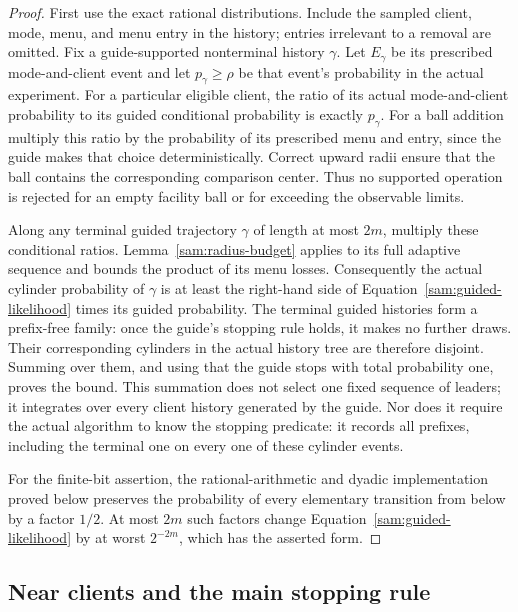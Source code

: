 \begin{proof}
First use the exact rational distributions.  Include the sampled client,
mode, menu, and menu entry in the history; entries irrelevant to a removal
are omitted.  Fix a guide-supported nonterminal history $\gamma$.
Let $E_\gamma$ be its prescribed mode-and-client event and let
$p_\gamma\ge\rho$ be that event's probability in the actual experiment.
For a particular eligible client, the ratio of its actual mode-and-client
probability to its guided conditional probability is exactly $p_\gamma$.
For a ball addition multiply this ratio by the probability of its
prescribed menu and entry, since the guide makes that choice deterministically.
Correct upward radii ensure that the ball contains the corresponding
comparison center.  Thus no supported operation is rejected for an empty
facility ball or for exceeding the observable limits.

Along any terminal guided trajectory $\gamma$ of length at most $2m$,
multiply these conditional ratios.  Lemma~\ref{sam:radius-budget} applies
to its full adaptive sequence and bounds the product of its menu losses.
Consequently the actual cylinder probability of $\gamma$ is at least the
right-hand side of Equation~\eqref{sam:guided-likelihood} times its guided
probability.  The terminal guided histories form a prefix-free family:
once the guide's stopping rule holds, it makes no further draws.
Their corresponding cylinders in the actual history tree are therefore
disjoint.  Summing over them, and using that the guide stops with total
probability one, proves the bound.  This summation does not select one
fixed sequence of leaders; it integrates over every client history generated
by the guide.  Nor does it require the actual algorithm to know the
stopping predicate: it records all prefixes, including the terminal one
on every one of these cylinder events.

For the finite-bit assertion, the rational-arithmetic and dyadic
implementation proved below preserves the probability of every elementary
transition from below by a factor $1/2$.  At most $2m$ such factors change
Equation~\eqref{sam:guided-likelihood} by at worst $2^{-2m}$, which has
the asserted form.
\end{proof}

\subsection{Near clients and the main stopping rule}

